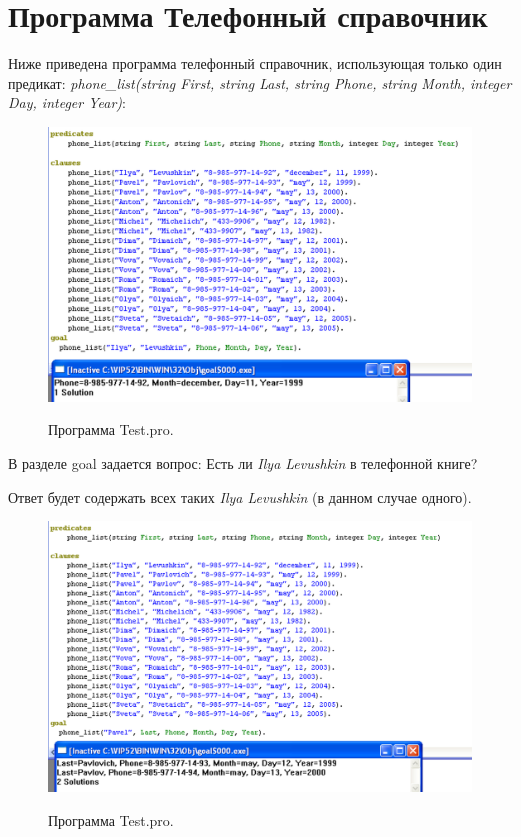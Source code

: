 \documentclass[a4paper,12pt]{article}
\begin{document}
	\section{Программа Телефонный справочник}
	
	Ниже приведена программа телефонный справочник, использующая только один предикат: \textit{phone\_list(string First, string Last, string Phone, string Month, integer Day, integer Year)}:
	
	\begin{figure}[h!]
		\begin{center}
			{\includegraphics[scale = 0.7]{program_1.png}}
			\label{prog_1}
		\end{center}
		\caption{Программа Test.pro.}
	\end{figure}

	\newpage

	В разделе goal задается вопрос: Есть ли \textit{Ilya Levushkin} в телефонной книге?
	
	Ответ будет содержать всех таких \textit{Ilya Levushkin} (в данном случае одного).
	
	\begin{figure}[h!]
		\begin{center}
			{\includegraphics[scale = 0.7]{program_2.png}}
			\label{prog_2}
		\end{center}
		\caption{Программа Test.pro.}
	\end{figure}
	
\end{document}
